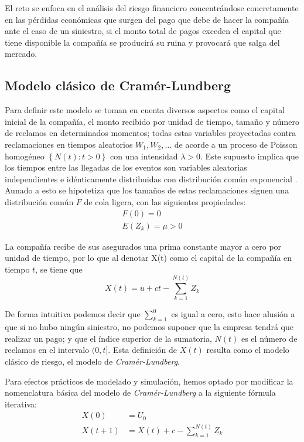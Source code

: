 \documentclass[journal]{IEEEtran}
\begin{document}
        El reto se enfoca en el análisis del riesgo financiero concentrándose concretamente en las pérdidas económicas que surgen del pago que debe de hacer la compañía ante el caso de un siniestro, si el monto total de pagos exceden el capital que tiene disponible la compañía se producirá su ruina y provocará que salga del mercado. 
    
        \subsection{Modelo clásico de Cramér-Lundberg}\label{cap:CL}
        
            Para definir este modelo se toman en cuenta diversos aspectos como el capital inicial de la compañía, el monto recibido por unidad de tiempo, tamaño y número de reclamos en determinados momentos; todas estas variables proyectadas contra reclamaciones en tiempos aleatorios $W_1, W_2, \ldots$ de acorde a un proceso de Poisson homogéneo $\left\{N(t): t > 0\right\}$ con una intensidad $\lambda > 0$. Este supuesto implica que los tiempos entre las llegadas de los eventos son variables aleatorias independientes e idénticamente distribuidas con distribución común exponencial \cite{ekaterina}. Aunado a esto se hipotetiza que los tamaños de estas reclamaciones siguen una distribución común $F$ de cola ligera, con las siguientes propiedades:
            \begin{gather*}
                F(0) = 0 \\
                E(Z_k) = \mu >0
            \end{gather*}

            La compañía recibe de sus asegurados una prima constante mayor a cero por unidad de tiempo, por lo que al denotar X(t) como el capital de la compañía en tiempo $t$, se tiene que
            \begin{equation}\label{eqn:classical-cramer}
                X(t) = u + ct -\sum_{k=1}^{N(t)}Z_k
            \end{equation}

            De forma intuitiva podemos decir que $\sum_{k=1}^{0}$ es igual a cero, esto hace alusión a que si no hubo ningún siniestro, no podemos suponer que la empresa tendrá que realizar un pago; y que el índice superior de la sumatoria, $N(t)$ es el número de reclamos en el intervalo $(0,t]$. Esta definición de $X(t)$ resulta como el modelo clásico de riesgo, el modelo de \emph{Cramér-Lundberg}.

            Para efectos prácticos de modelado y simulación, hemos optado por modificar la nomenclatura básica del modelo de \emph{Cramér-Lundberg} a la siguiente fórmula iterativa:
            \begin{equation}\label{eqn:iterative-cramer}
                \begin{aligned}
                    X(0) &= U_0 \\
                    X(t+1) &= X(t) + c -\sum_{k=1}^{N(t)}Z_k
                \end{aligned}
            \end{equation}
\end{document}
